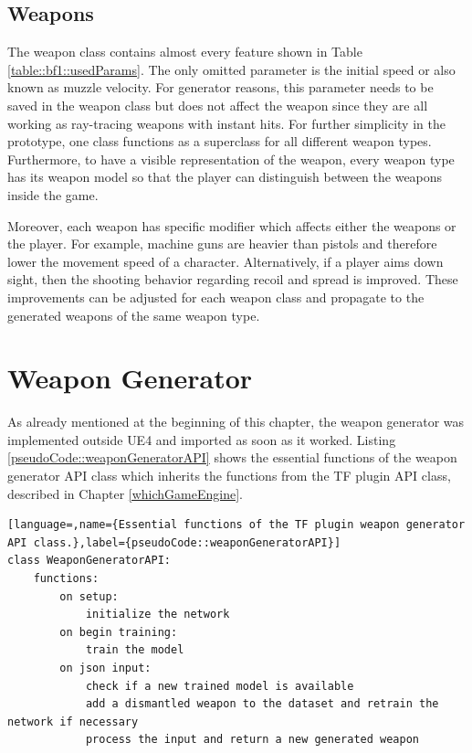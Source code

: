 \documentclass[MGS,Master,english]{twbook}%
\begin{document}
\subsection{Weapons}
The weapon class contains almost every feature shown in Table \ref{table::bf1::usedParams}. The only omitted parameter is the initial speed or also known as muzzle velocity. For generator reasons, this parameter needs to be saved in the weapon class but does not affect the weapon since they are all working as ray-tracing weapons with instant hits. For further simplicity in the prototype, one class functions as a superclass for all different weapon types. Furthermore, to have a visible representation of the weapon, every weapon type has its weapon model so that the player can distinguish between the weapons inside the game. 

Moreover, each weapon has specific modifier which affects either the weapons or the player. For example, machine guns are heavier than pistols and therefore lower the movement speed of a character. Alternatively, if a player aims down sight, then the shooting behavior regarding recoil and spread is improved. These improvements can be adjusted for each weapon class and propagate to the generated weapons of the same weapon type.

\section{Weapon Generator}
As already mentioned at the beginning of this chapter, the weapon generator was implemented outside \ac{UE4} and imported as soon as it worked. Listing \ref{pseudoCode::weaponGeneratorAPI} shows the essential functions of the weapon generator \ac{API} class which inherits the functions from the \ac{TF} plugin \ac{API} class, described in Chapter \ref{whichGameEngine}. 
\begin{lstlisting}[language=,name={Essential functions of the TF plugin weapon generator API class.},label={pseudoCode::weaponGeneratorAPI}]
class WeaponGeneratorAPI:
	functions:
		on setup:
			initialize the network
		on begin training:
			train the model
		on json input:
			check if a new trained model is available
			add a dismantled weapon to the dataset and retrain the network if necessary
			process the input and return a new generated weapon
\end{lstlisting}
\end{document}
